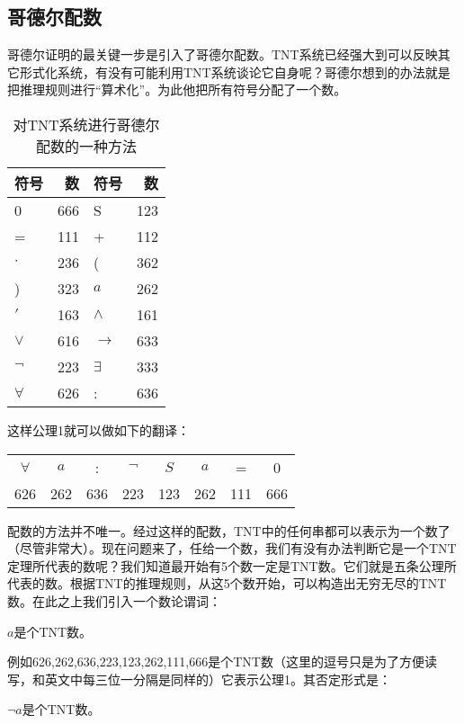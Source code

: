 \documentclass{article}
\begin{document}
\subsection{哥德尔配数}
哥德尔证明的最关键一步是引入了哥德尔配数。TNT系统已经强大到可以反映其它形式化系统，有没有可能利用TNT系统谈论它自身呢？哥德尔想到的办法就是把推理规则进行“算术化”。为此他把所有符号分配了一个数。

\begin{table}[htbp]
\centering
\begin{tabular}{|l|r||l|r|}
\hline
\textbf{符号} & \textbf{数} & \textbf{符号} & \textbf{数} \\
\hline
0 & 666 & S & 123 \\
\hline
= & 111 & + & 112 \\
\hline
$\cdot$ & 236 & ( & 362 \\
\hline
) & 323 & $a$ & 262 \\
\hline
$'$ & 163 & $\land$ & 161 \\
\hline
$\lor$ & 616 & $\to$ & 633 \\
\hline
$\lnot$ & 223 & $\exists$ & 333 \\
\hline
$\forall$ & 626 & : & 636 \\
\hline
\end{tabular}
\caption{对TNT系统进行哥德尔配数的一种方法}
\end{table}

这样公理1就可以做如下的翻译：

\begin{tabular}{cccccccc}
$\forall$ & $a$ & : & $\lnot$ & $S$ & $a$ & = & 0 \\
626 & 262 & 636 & 223 & 123 & 262 & 111 & 666 \\
\end{tabular}

配数的方法并不唯一。经过这样的配数，TNT中的任何串都可以表示为一个数了（尽管非常大）。现在问题来了，任给一个数，我们有没有办法判断它是一个TNT定理所代表的数呢？我们知道最开始有5个数一定是TNT数。它们就是五条公理所代表的数。根据TNT的推理规则，从这5个数开始，可以构造出无穷无尽的TNT数。在此之上我们引入一个数论谓词：

\begin{center}
$a$是个TNT数。
\end{center}

例如626,262,636,223,123,262,111,666是个TNT数（这里的逗号只是为了方便读写，和英文中每三位一分隔是同样的）它表示公理1。其否定形式是：

\begin{center}
$\lnot a$是个TNT数。
\end{center}
\end{document}
